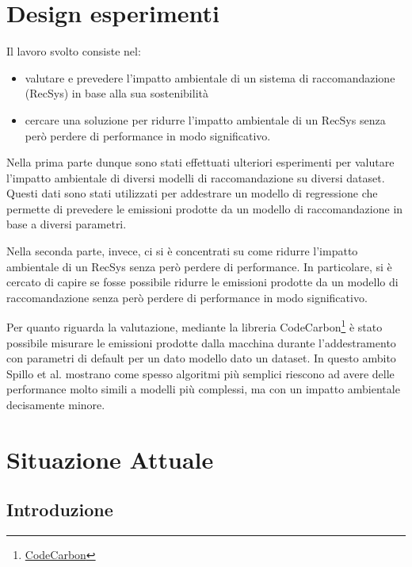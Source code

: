 \section{Design esperimenti}



\noindent Il lavoro svolto consiste nel: 
\begin{itemize}
    \item valutare e prevedere l'impatto ambientale di un sistema di raccomandazione (RecSys) in base alla sua sostenibilità
    \item cercare una soluzione per ridurre l'impatto ambientale di un RecSys senza però perdere di performance in modo significativo.
\end{itemize}

\noindent Nella prima parte dunque sono stati effettuati ulteriori esperimenti per valutare l'impatto ambientale di diversi modelli di raccomandazione su diversi dataset. Questi dati sono stati utilizzati per addestrare un modello di regressione che permette di prevedere le emissioni prodotte da un modello di raccomandazione in base a diversi parametri.


\noindent Nella seconda parte, invece, ci si è concentrati su come ridurre l'impatto ambientale di un RecSys senza però perdere di performance. In particolare, si è cercato di capire se fosse possibile ridurre le emissioni prodotte da un modello di raccomandazione senza però perdere di performance in modo significativo.



\noindent Per quanto riguarda la valutazione, mediante la libreria CodeCarbon\footnote{\href{http://codecarbon.io}{CodeCarbon}}{} è stato possibile misurare le emissioni prodotte dalla macchina durante l'addestramento con parametri di default per un dato modello dato un dataset. 
In questo ambito  Spillo et al.\cite{spillo2023towards} mostrano come spesso algoritmi più semplici riescono ad avere delle performance molto simili a modelli più complessi, ma con un impatto ambientale decisamente minore.

\section{Situazione Attuale}


\subsection{Introduzione}

